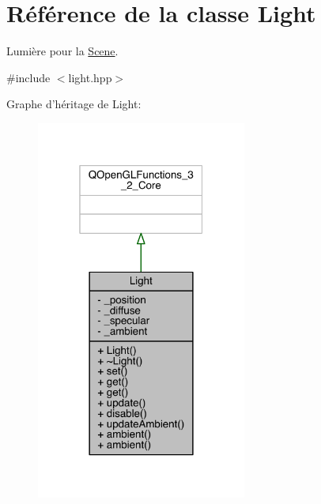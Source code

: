 \hypertarget{class_light}{\section{Référence de la classe Light}
\label{class_light}
}


Lumière pour la \hyperlink{class_scene}{Scene}.  




{\ttfamily \#include $<$light.\+hpp$>$}



Graphe d'héritage de Light\+:
\nopagebreak
\begin{figure}[H]
\begin{center}
\leavevmode
\includegraphics[width=196pt]{class_light__inherit__graph}
\end{center}
\end{figure}


